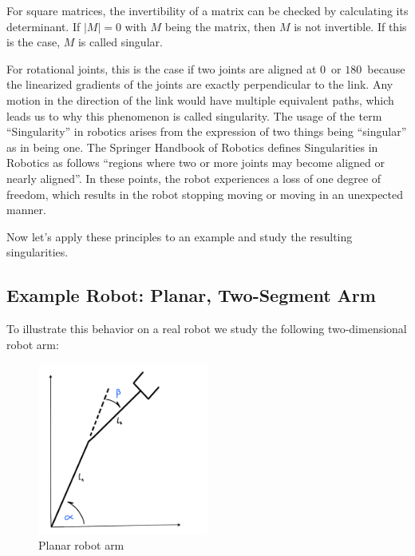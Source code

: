 \documentclass[journal]{IEEEtran}
\begin{document}
For square matrices, the invertibility of a matrix can be checked by calculating its determinant.
If $|M| = 0$ with $M$ being the matrix, then $M$ is not invertible\cite{MatheKagga}.
If this is the case, $M$ is called singular.

For rotational joints, this is the case if two joints are aligned at $0$\textdegree \ or $180$\textdegree \ because the linearized gradients of the joints are exactly perpendicular to the link\cite[5]{PatrickVonwirth}. Any motion in the direction of the link would have multiple equivalent paths, which leads us to why this phenomenon is called singularity. The usage of the term ``Singularity'' in robotics arises from the expression of two things being ``singular'' as in being one.
The Springer Handbook of Robotics defines Singularities in Robotics as follows ``regions where two or
more joints may become aligned or nearly aligned''\cite[78]{HandbookOfRobotics}.
In these points, the robot experiences a loss of one degree of freedom, which results in the robot stopping moving or moving in an unexpected manner.

Now let's apply these principles to an example and study the resulting singularities.

\subsection{Example Robot: Planar, Two-Segment Arm}
To illustrate this behavior on a real robot we study the following two-dimensional robot arm:

\begin{figure}[H]
    \centering
    \includegraphics[width=0.5\textwidth]{images/robot_arm.png}
    \caption{Planar robot arm}
    \label{fig:robot_arm}
\end{figure}
\end{document}
